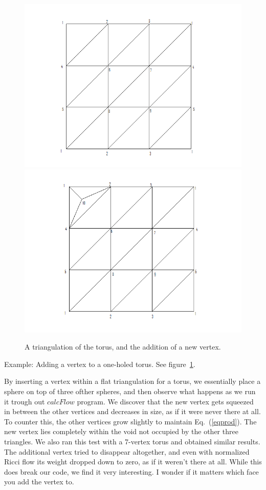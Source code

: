 \documentclass[12pt]{article}
\begin{document}
\begin{figure}
\includegraphics[scale = 0.5]{torus2.png}
\includegraphics[scale = 0.5]{torus2addvertex.png}
\caption{A triangulation of the torus, and the addition of a new vertex.}
\label{torusaddv}
\end{figure}
  
\noindent Example: Adding a vertex to a one-holed torus. See figure~\ref{torusaddv}. \newline

\noindent By inserting a vertex within a flat triangulation for a torus, we essentially place a sphere on top of three ofther spheres, and then observe what happens as we run it trough out $calcFlow$ program. We discover that the new vertex gets squeezed in between the other vertices and decreases in size, as if it were never there at all. To counter this, the other vertices grow slightly to maintain Eq.~(\ref{eqprod}). The new vertex lies completely within the void not occupied by the other three triangles. We also ran this test with a 7-vertex torus and obtained similar results. The additional vertex tried to disappear altogether, and even with normalized Ricci flow its weight dropped down to zero, as if it weren't there at all. While this does break our code, we find it very interesting. I wonder if it matters which face you add the vertex to. 
\end{document}
